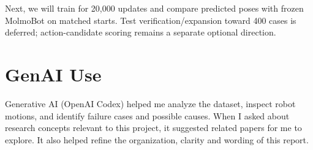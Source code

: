 \documentclass{article}
\begin{document}
Next, we will train for 20,000 updates and compare predicted poses with frozen
MolmoBot on matched starts. Test verification/expansion toward 400 cases is
deferred; action-candidate scoring remains a separate optional direction.



\clearpage
\appendix
\section{GenAI Use}
Generative AI (OpenAI Codex) helped me analyze the dataset, inspect robot
motions, and identify failure cases and possible causes. When I asked about
research concepts relevant to this project, it suggested related papers for me
to explore. It also helped refine the organization, clarity and wording of
this report.
\end{document}
